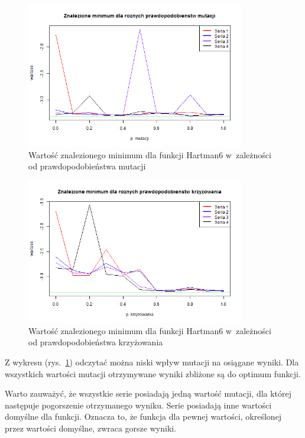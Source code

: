 \documentclass[11pt, a4paper]{article}
\newcommand{\fbi}{\leavevmode{\parindent=1em\indent}}
\begin{document}
\begin{figure}[H]
	\begin{center}
		\includegraphics[width=0.85\textwidth]{./assets/Hartman62.png}
		\caption{Wartość znalezionego minimum dla funkcji Hartman6 w~zależności od prawdopodobieństwa mutacji}
		\label{fig:hartman62}
	\end{center}
\end{figure}

\begin{figure}[H]
	\begin{center}
		\includegraphics[width=0.85\textwidth]{./assets/Hartman63.png}
		\caption{Wartość znalezionego minimum dla funkcji Hartman6 w~zależności od prawdopodobieństwa krzyżowania}
		\label{fig:hartman63}
	\end{center}
\end{figure}

\fbi
Z wykresu (rys.~\ref{fig:hartman62}) odczytać można niski wpływ mutacji na osiągane wyniki. Dla wszystkich wartości mutacji otrzymywane wyniki zbliżone są do optimum funkcji.

\fbi
Warto zauważyć, że wszystkie serie posiadają jedną wartość mutacji, dla której następuje pogorszenie otrzymanego wyniku. Serie posiadają inne wartości domyślne dla funkcji. Oznacza to, że funkcja dla pewnej wartości, określonej przez wartości domyślne, zwraca gorsze wyniki.
\end{document}
